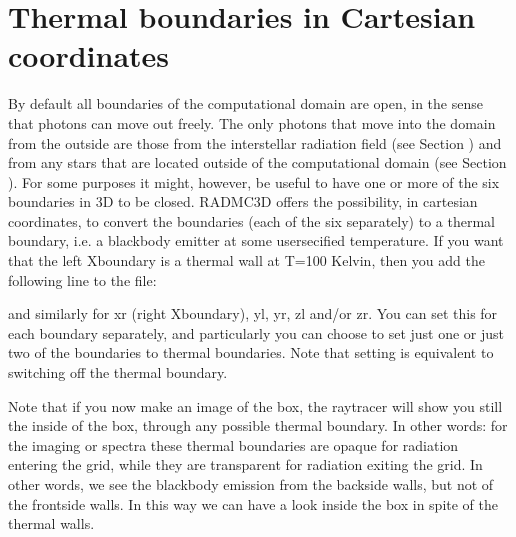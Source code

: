 \documentclass[letterpaper,10pt,english]{sphinxmanual}
\begin{document}
\section{Thermal boundaries in Cartesian coordinates}
\label{\detokenize{gridding:thermal-boundaries-in-cartesian-coordinates}}\label{\detokenize{gridding:sec-thermal-boundaries}}
By default all boundaries of the computational domain are open, in the sense
that photons can move out freely. The only photons that move into the domain
from the outside are those from the interstellar radiation field (see Section
{\hyperref[\detokenize{stars:sec-external-source}]{}}) and from any stars that are located outside of the
computational domain (see Section {\hyperref[\detokenize{inputoutputfiles:sec-stars}]{}}). For some purposes it might,
however, be useful to have one or more of the six boundaries in 3\sphinxhyphen{}D to be
closed. RADMC\sphinxhyphen{}3D offers the possibility, in cartesian coordinates, to convert
the boundaries (each of the six separately) to a thermal boundary, i.e. a
blackbody emitter at some user\sphinxhyphen{}secified temperature. If you want that the left
X\sphinxhyphen{}boundary is a thermal wall at T=100 Kelvin, then you add the following line to
the  file:

\begin{sphinxVerbatim}[commandchars=\\\{\}]
  
\end{sphinxVerbatim}

and similarly for xr (right X\sphinxhyphen{}boundary), yl, yr, zl and/or zr. You can set this
for each boundary separately, and particularly you can choose to set just one or
just two of the boundaries to thermal boundaries. Note that setting
 is equivalent to switching off the thermal boundary.

Note that if you now make an image of the box, the ray\sphinxhyphen{}tracer will show you
still the inside of the box, through any possible thermal boundary. In other
words: for the imaging or spectra these thermal boundaries are opaque for
radiation entering the grid, while they are transparent for radiation exiting
the grid. In other words, we see the blackbody emission from the backside walls,
but not of the frontside walls. In this way we can have a look inside the box in
spite of the thermal walls.
\end{document}
